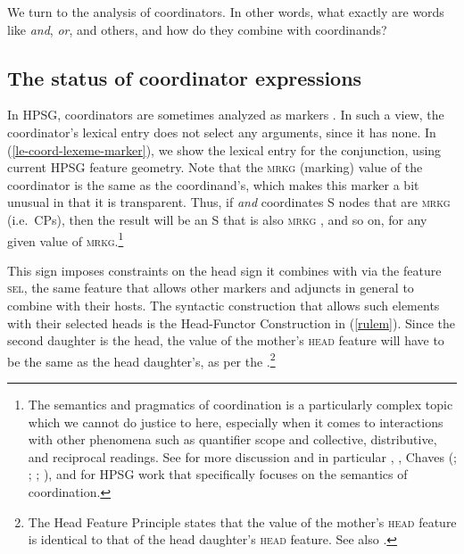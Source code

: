 We turn to  the  analysis of coordinators. 
In other words, what exactly are words like \emph{and}, \emph{or}, 
and others, and how do they combine with coordinands?

\subsection{The status of coordinator expressions}


In HPSG, coordinators are sometimes analyzed as markers \parencites[Section~4.1]{Beavers}[Section~4.1]{Drellishak:Bender:05}. In such a view, the coordinator's lexical entry does not select any arguments, since it has none. In (\ref{le-coord-lexeme-marker}), we show the lexical entry for the conjunction, using current HPSG feature geometry. Note that the \textsc{mrkg} (marking) value of the coordinator is the same as the coordinand's, which makes this marker a bit unusual in that it is transparent. Thus, if \emph{and} coordinates S nodes that are \textsc{mrkg}  (i.e.\ CPs), then the result will be 
an S that is also \textsc{mrkg} , and so on, for any given value of
\textsc{mrkg}.\footnote{The semantics and pragmatics of coordination  is a particularly complex topic which we cannot do justice to here, especially when it comes to interactions with other phenomena such as quantifier scope and collective, distributive, and reciprocal readings.
See  for more discussion and 
in particular \citet[Section~6.7]{mrs},  \citet{jfast}, 
Chaves (\citeyear[Chapters~4--6]{chavesthesis}; \citeyear[Section~5.3]{chavesextr}; \citeyear{chavessubjexp}; \citeyear{Chaves:09}), 
and \citet[Chapters~4--5]{sangheepark} for HPSG work that specifically focuses on the semantics of coordination.}

\ea
{}\label{le-coord-lexeme-marker}
\z




\noindent
This sign imposes constraints on the head sign it combines with via the feature \textsc{sel}, the same feature that allows other markers and 
adjuncts in general to combine with their
hosts. The syntactic construction that allows such elements with their selected heads is the Head-Functor Construction in (\ref{rulem}).
Since the second daughter is the head, the value of the mother's \textsc{head} feature will have to be the same as the head daughter's, as per the
.\footnote{The Head Feature Principle \citep[]{pollardsag} states that the value of
the mother's \textsc{head} feature is identical to that of the head daughter's \textsc{head}
feature. See also \crossrefchaptert[\page \pageref{page-hfp}]{properties}.}

